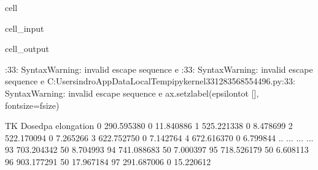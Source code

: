 \documentclass[letterpaper,10pt,english]{jupyterBook}
\begin{document}
\begin{sphinxuseclass}{cell}
\begin{sphinxVerbatimInput}
\begin{sphinxuseclass}{cell_input}
\begin{sphinxVerbatim}[commandchars=\\\{\}]
					 
					 
					\PYG{l+s+s1}{\PYGZdl{} [}\PYG{l+s+s1}{]} 
					 
				\end{sphinxVerbatim}
				
		\end{sphinxuseclass}\end{sphinxVerbatimInput}
		\begin{sphinxVerbatimOutput}
			
			\begin{sphinxuseclass}{cell_output}
				\begin{sphinxVerbatim}[commandchars=\\\{\}]
					\PYGZlt{}\PYGZgt{}:33: SyntaxWarning: invalid escape sequence \PYGZsq{}\PYGZbs{}e\PYGZsq{}
					\PYGZlt{}\PYGZgt{}:33: SyntaxWarning: invalid escape sequence \PYGZsq{}\PYGZbs{}e\PYGZsq{}
					C:\PYGZbs{}Users\PYGZbs{}indro\PYGZbs{}AppData\PYGZbs{}Local\PYGZbs{}Temp\PYGZbs{}ipykernel\PYGZus{}33128\PYGZbs{}3568554496.py:33: SyntaxWarning: invalid escape sequence \PYGZsq{}\PYGZbs{}e\PYGZsq{}
					ax.set\PYGZus{}zlabel(\PYGZsq{}\PYGZdl{}\PYGZbs{}epsilon\PYGZus{}\PYGZob{}tot\PYGZcb{}\PYGZdl{} [\PYGZpc{}]\PYGZsq{}, fontsize=f\PYGZus{}size)
				\end{sphinxVerbatim}
				
				\begin{sphinxVerbatim}[commandchars=\\\{\}]
					TK  Dosedpa  elongation
					0   290.595380        0   11.840886
					1   525.221338        0    8.478699
					2   522.170094        0    7.265266
					3   622.752750        0    7.142764
					4   672.616370        0    6.799844
					..         ...      ...         ...
					93  703.204342       50    8.704993
					94  741.088683       50    7.000397
					95  718.526179       50    6.608113
					96  903.177291       50   17.967184
					97  291.687006        0   15.220612
					

\end{sphinxVerbatim}
\end{sphinxuseclass}
\end{sphinxVerbatimOutput}
\end{sphinxuseclass}
\end{document}
